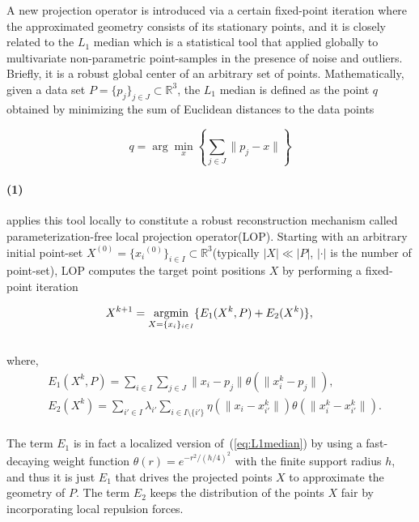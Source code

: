 A new projection operator is introduced via a certain fixed-point iteration where the approximated geometry consists of its stationary points,
and it is closely related to the $L_1$ median\cite{brown1983statistical,small1990survey} which is a statistical tool that applied globally to multivariate non-parametric point-samples in the presence of noise and outliers.
Briefly, it is a robust global center of an arbitrary set of points. Mathematically, given a data set $P=\{p_{j}\}_{j\in J}\subset \mathbb{R}^3$, the $L_1$ median is defined as the point $q$ obtained by minimizing the sum of Euclidean distances to the data points

\small{
\begin{equation}
 \label{eq:L1median}
 q=\arg\min_{x}\left\{ \sum_{j\in J}^{}\|p_{j}-x\| \right\}
\end{equation}
}

\paragraph{(1)}

\cite{lipman2007parameterization} applies this tool locally to constitute a robust reconstruction mechanism called parameterization-free local projection operator(LOP).
Starting with an arbitrary initial point-set $X^{(0)}=\{{x_{i}}^{(0)}\}_{i\in I}\subset \mathbb{R}^3$(typically $|X|\ll|P|$, $|\cdot|$ is the number of point-set),
LOP computes the target point positions $X$ by performing a fixed-point iteration

\small{
\begin{equation}
 \label{eq:LOP1}
 X^{k+1}=\mathop{\operatorname*{argmin}}_{X=\{x_{i}\}_{i\in I}}\{E_1(X^{k},P)+E_2(X^{k})\},\\
\end{equation}
}
\\
where,
\small{
\begin{equation}
 \label{eq:LOP2}
 \begin{split}
 & E_1(X^{k},P)=\sum_{i\in I}^{}\sum_{j\in J}^{}\|x_{i}-p_{j}\|\theta(\|x{_i^k}-p_{j}\|),\\
 & E_2(X^{k})=\sum_{i'\in I}^{}\lambda_{i'}\sum_{i\in I\setminus\{i'\}}^{} \eta(\|x_{i}-x{_{i'}^k}\|)\theta(\|x{_i^k}-x{_{i'}^k}\|).
 \end{split}
\end{equation}
}
\\
The term $E_1$ is in fact a localized version of~(\ref{eq:L1median}) by using a fast-decaying weight function $\theta(r)=e^{-r^2/(h/4)^2}$ with the finite support radius $h$,
and thus it is just $E_1$ that drives the projected points $X$ to approximate the geometry of $P$.
The term $E_2$ keeps the distribution of the points $X$ fair by incorporating local repulsion forces.

